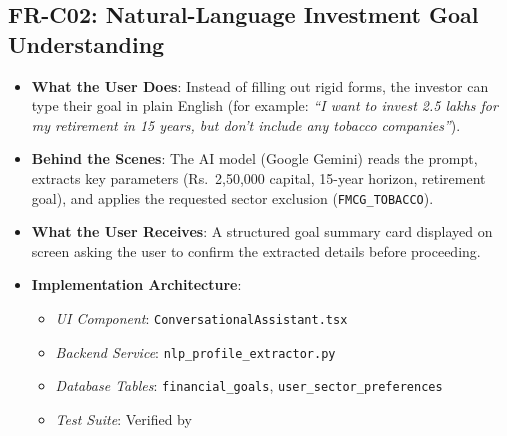 \subsection{FR-C02: Natural-Language Investment Goal Understanding}
\begin{itemize}
    \item \textbf{What the User Does}: Instead of filling out rigid forms, the investor can type their goal in plain English (for example: \textit{``I want to invest 2.5 lakhs for my retirement in 15 years, but don't include any tobacco companies''}).
    \item \textbf{Behind the Scenes}: The AI model (Google Gemini) reads the prompt, extracts key parameters (Rs.~2,50,000 capital, 15-year horizon, retirement goal), and applies the requested sector exclusion (\texttt{FMCG\_TOBACCO}).
    \item \textbf{What the User Receives}: A structured goal summary card displayed on screen asking the user to confirm the extracted details before proceeding.
    \item \textbf{Implementation Architecture}:
    \begin{itemize}
        \item \textit{UI Component}: \texttt{ConversationalAssistant.tsx}
        \item \textit{Backend Service}: \texttt{nlp\_profile\_extractor.py}
        \item \textit{Database Tables}: \texttt{financial\_goals}, \texttt{user\_sector\_preferences}
        \item \textit{Test Suite}: Verified by 
    \end{itemize}
\end{itemize}

